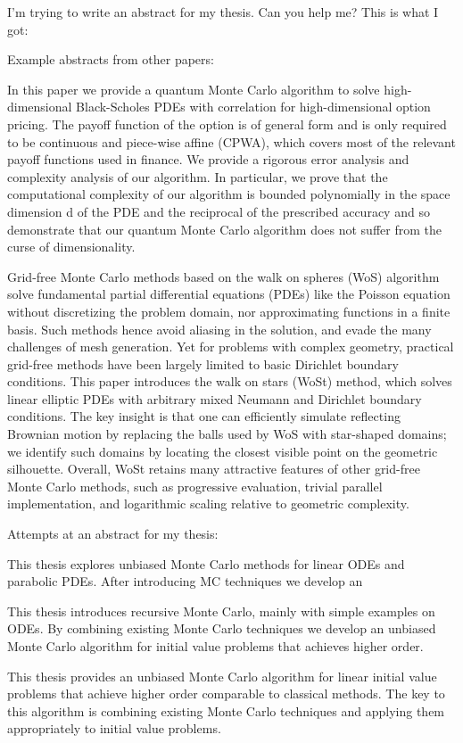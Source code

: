 I'm trying to write an abstract for my thesis. Can you help me?
This is what I got:

Example abstracts from other papers:

In this paper we provide a quantum Monte Carlo algorithm to
solve high-dimensional Black-Scholes PDEs with correlation
for high-dimensional option pricing. The payoff function
of the option is of general form and is only required to
be continuous and piece-wise affine (CPWA), which covers
most of the relevant payoff functions used in finance.
We provide a rigorous error analysis and complexity
analysis of our algorithm. In particular, we prove
that the computational complexity of our algorithm
is bounded polynomially in the space dimension d of
the PDE and the reciprocal of the prescribed accuracy
and so demonstrate that our quantum Monte Carlo algorithm
does not suffer from the curse of dimensionality.

Grid-free Monte Carlo methods based on the walk on spheres (WoS) algorithm
solve fundamental partial differential equations (PDEs) like the Poisson
equation without discretizing the problem domain, nor approximating functions
in a finite basis. Such methods hence avoid aliasing in the solution, and evade
the many challenges of mesh generation. Yet for problems with complex geometry,
practical grid-free methods have been largely limited to basic Dirichlet boundary
conditions. This paper introduces the walk on stars (WoSt) method, which solves
linear elliptic PDEs with arbitrary mixed Neumann and Dirichlet boundary conditions.
The key insight is that one can efficiently simulate reflecting Brownian
motion by replacing the balls used by WoS with star-shaped domains; we identify
such domains by locating the closest visible point on the geometric silhouette.
Overall, WoSt retains many attractive features of other grid-free Monte Carlo methods,
such as progressive evaluation, trivial parallel implementation, and logarithmic
scaling relative to geometric complexity.

Attempts at an abstract for my thesis:

This thesis explores unbiased Monte Carlo methods for linear ODEs and parabolic PDEs.
After introducing MC techniques we develop an


This thesis introduces recursive Monte Carlo, mainly with simple examples on
ODEs. By combining existing Monte Carlo techniques we develop an
unbiased Monte Carlo algorithm for initial value problems that achieves higher order.

This thesis provides an unbiased Monte Carlo
algorithm for linear initial value
problems that achieve higher order
comparable to classical methods. The key
to this algorithm is combining existing Monte Carlo
techniques and applying them appropriately to initial
value problems.


